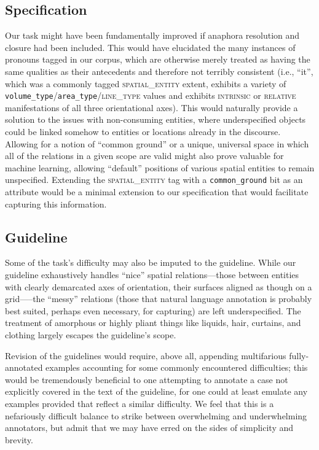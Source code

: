 \documentclass[11pt]{article}
\begin{document}

\subsection{Specification} %
\label{sebsec:specification}

Our task might have been fundamentally improved if anaphora resolution and closure had been included. This would have elucidated the many instances of pronouns tagged in our corpus, which are otherwise merely treated as having the same qualities as their antecedents and therefore not terribly consistent (i.e., ``it'', which was a commonly tagged \textsc{spatial\_entity} extent, exhibits a variety of \texttt{volume\_type}/\texttt{area\_type}/\textsc{line\_type} values and exhibits \textsc{intrinsic} or \textsc{relative} manifestations of all three orientational axes). This would naturally provide a solution to the issues with non-consuming entities, where underspecified objects could be linked somehow to entities or locations already in the discourse. Allowing for a notion of ``common ground'' or a unique, universal space in which all of the relations in a given scope are valid might also prove valuable for machine learning, allowing ``default'' positions of various spatial entities to remain unspecified. Extending the \textsc{spatial\_entity} tag with a \texttt{common\_ground} bit as an attribute would be a minimal extension to our specification that would facilitate capturing this information.



\subsection{Guideline} %
\label{subsec:guideline}

Some of the task's difficulty may also be imputed to the guideline. While our guideline exhaustively handles ``nice'' spatial relations---those between entities with clearly demarcated axes of orientation, their surfaces aligned as though on a grid—--the ``messy'' relations (those that natural language annotation is probably best suited, perhaps even necessary, for capturing) are left underspecified. The treatment of amorphous or highly pliant things like liquids, hair, curtains, and clothing largely escapes the guideline's scope.

Revision of the guidelines would require, above all, appending multifarious fully-annotated examples accounting for some commonly encountered difficulties; this would be tremendously beneficial to one attempting to annotate a case not explicitly covered in the text of the guideline, for one could at least emulate any examples provided that reflect a similar difficulty. We feel that this is a nefariously difficult balance to strike between overwhelming and underwhelming annotators, but admit that we may have erred on the sides of simplicity and brevity.
\end{document}
